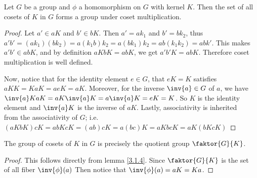 \begin{theorem}\label{3.1.6}
    Let $G$ be a group and  $\phi$ a homomorphism on $G$ with kernel  $K$. Then
    the set of all cosets of  $K$ in  $G$ forms a group under coset
    multiplication.
\end{theorem}
\begin{proof}
    Let $a' \in aK$ and  $b' \in bK$. Then  $a'=ak_1$ and $b'=bk_2$, thus
    $a'b'=(ak_1)(bk_2)=a(k_1b)k_2=a(bk_1)k_2=ab(k_1k_2)=abk'$. This makes $a'b'
    \in abK$, and by definition  $aKbK=abK$, we get  $a'b'K=abK$. Therefore
    coset multiplication is well defined.

    Now, notice that for the identity element  $e \in G$, that $eK=K$ satisfies
    $aKK=KaK=aeK=aK$. Moreover, for the inverse  $\inv{a} \in G$ of $a$, we have
     $\inv{a}KaK=aK\inv{a}K=a\inv{a}K=eK=K$. So $K$ is the identity element and
     $\inv{a}K$ is the inverse of  $aK$. Lastly, associativity is inherited from
     the associativity of $G$; i.e.
     $(aKbK)cK=abKcK=(ab)cK=a(bc)K=aKbcK=aK(bKcK)$
\end{proof}
\begin{corollary}
    The group of cosets of $K$ in  $G$ is precisely the quotient group
    $\faktor{G}{K}$.
\end{corollary}
\begin{proof}
    This follows directly from lemma \ref{3.1.4}. Since $\faktor{G}{K}$ is the
    set of all fiber $\inv{\phi}(a)$ Then notice that $\inv{\phi}(a)=aK=Ka$.
\end{proof}

